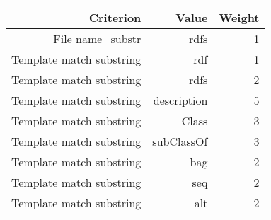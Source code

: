 \begin{tabular}{|r|r|r|}
\hline
\bf Criterion&\bf Value&\bf Weight\\
\hline
File name_substr&rdfs&1\\
\hline
Template match substring&rdf&1\\
\hline
Template match substring&rdfs&2\\
\hline
Template match substring&description&5\\
\hline
Template match substring&Class&3\\
\hline
Template match substring&subClassOf&3\\
\hline
Template match substring&bag&2\\
\hline
Template match substring&seq&2\\
\hline
Template match substring&alt&2\\
\hline
\end{tabular}
